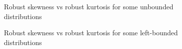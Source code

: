 \documentclass[
  fleqn,
  deca,
  blindrev
]{informs4}
\begin{document}
\begin{figure}


\caption{\label{fig-unbounded}Robust skewness vs robust kurtosis for
some unbounded distributions}

\end{figure}%

\begin{figure}


\caption{\label{fig-semibounded}Robust skewness vs robust kurtosis for
some left-bounded distributions}

\end{figure}%
\end{document}
